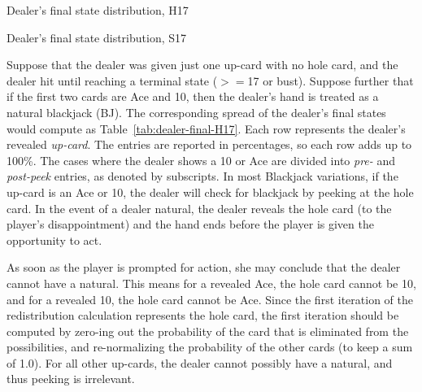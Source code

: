 \begin{table}[ht!]
\caption{Dealer's final state distribution, H17}
\begin{center}

\end{center}
\label{tab:dealer-final-H17}
\end{table}

\begin{table}[ht!]
\caption{Dealer's final state distribution, S17}
\begin{center}

\end{center}
\label{tab:dealer-final-S17}
\end{table}

Suppose that the dealer was given just one up-card with no hole card, 
and the dealer hit until reaching a terminal state ($>=$17 or bust).
Suppose further that if the first two cards are Ace and 10,
then the dealer's hand is treated as a natural blackjack (BJ).
The corresponding spread of the dealer's final states would compute as 
Table~\ref{tab:dealer-final-H17}.
Each row represents the dealer's revealed \emph{up-card}.
The entries are reported in percentages, so each row adds up to 100\%.
The cases where the dealer shows a 10 or Ace are divided into 
\emph{pre-} and \emph{post-peek} entries, as denoted by subscripts.  
In most Blackjack variations, if the up-card is an Ace or 10, 
the dealer will check for blackjack by peeking at the hole card.
In the event of a dealer natural, 
the dealer reveals the hole card (to the player's disappointment)
and the hand ends before the player is given the opportunity to act.

As soon as the player is prompted for action, she may conclude that the 
dealer cannot have a natural.
This means for a revealed Ace, the hole card cannot be 10, 
and for a revealed 10, the hole card cannot be Ace.
Since the first iteration of the redistribution 
calculation represents the hole card, the first iteration
should be computed by zero-ing out the probability of the
card that is eliminated from the possibilities, and re-normalizing
the probability of the other cards (to keep a sum of 1.0).  
For all other up-cards, the dealer cannot possibly have a natural,
and thus peeking is irrelevant.

\begin{comment}
\begin{table}[ht!]
\caption{Dealer's final state distribution, S17, pre-peek}
\begin{center}

\end{center}
\label{tab:dealer-final-S17-pre-peek}
\end{table}

\begin{table}[ht!]
\caption{Dealer's final state distribution, S17, post-peek}
\begin{center}

\end{center}
\label{tab:dealer-final-S17-post-peek}
\end{table}
\end{comment}

